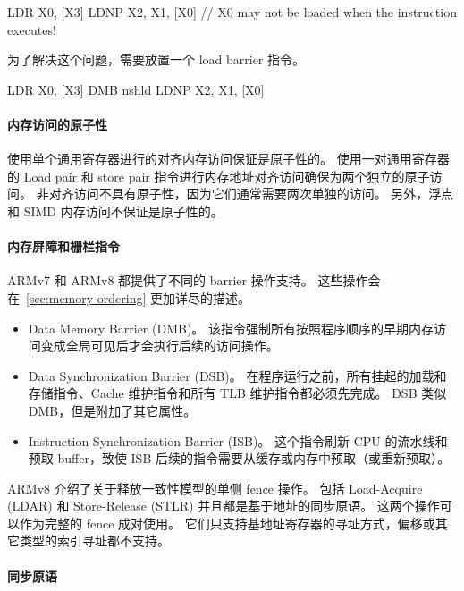 \begin{lstcode}
  LDR X0, [X3]
  LDNP X2, X1, [X0] // X0 may not be loaded when the instruction executes!
\end{lstcode}

为了解决这个问题，需要放置一个 load barrier 指令。

\begin{lstcode}
  LDR X0, [X3]
  DMB nshld
  LDNP X2, X1, [X0]
\end{lstcode}

\paragraph{内存访问的原子性}

使用单个通用寄存器进行的对齐内存访问保证是原子性的。
使用一对通用寄存器的 Load pair 和 store pair 指令进行内存地址对齐访问确保为两个独立的原子访问。
非对齐访问不具有原子性，因为它们通常需要两次单独的访问。
另外，浮点和 SIMD 内存访问不保证是原子性的。

\paragraph{内存屏障和栅栏指令}

ARMv7 和 ARMv8 都提供了不同的 barrier 操作支持。
这些操作会在~\ref{sec:memory-ordering} 更加详尽的描述。

\begin{itemize}
  \item Data Memory Barrier (DMB)。
  该指令强制所有按照程序顺序的早期内存访问变成全局可见后才会执行后续的访问操作。
  \item Data Synchronization Barrier (DSB)。
    在程序运行之前，所有挂起的加载和存储指令、Cache 维护指令和所有 TLB 维护指令都必须先完成。
    DSB 类似 DMB，但是附加了其它属性。
  \item Instruction Synchronization Barrier (ISB)。
    这个指令刷新 CPU 的流水线和预取 buffer，致使 ISB 后续的指令需要从缓存或内存中预取（或重新预取）。
\end{itemize}

ARMv8 介绍了关于释放一致性模型的单侧 fence 操作。
包括 Load-Acquire (LDAR) 和 Store-Release (STLR) 并且都是基于地址的同步原语。
这两个操作可以作为完整的 fence 成对使用。
它们只支持基地址寄存器的寻址方式，偏移或其它类型的索引寻址都不支持。

\paragraph{同步原语}

